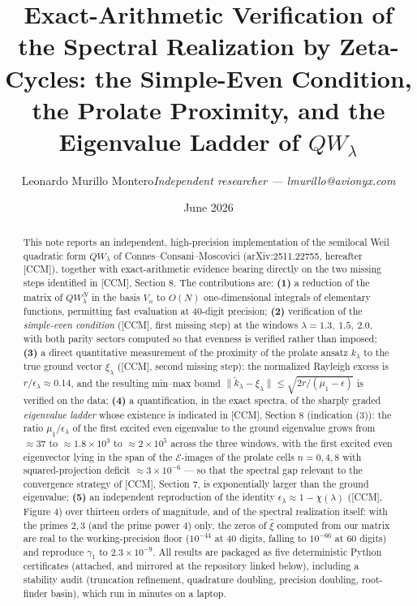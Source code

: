 \documentclass[
  letterpaper,
  11pt]{article}
\title{Exact-Arithmetic Verification of the Spectral Realization by Zeta-Cycles: the Simple-Even Condition, the Prolate Proximity, and the Eigenvalue Ladder of \(QW_\lambda\)}
\author{Leonardo Murillo Montero\newline\textit{Independent researcher — lmurillo@avionyx.com}}
\date{June 2026}
\theoremstyle{plain}
\theoremstyle{definition}
\theoremstyle{remark}
\begin{document}
\maketitle
\begin{abstract}
This note reports an independent, high-precision implementation of the semilocal Weil quadratic form \(QW_\lambda\) of Connes--Consani--Moscovici (arXiv:2511.22755, hereafter {[}CCM{]}), together with exact-arithmetic evidence bearing directly on the two missing steps identified in {[}CCM{]}, Section 8. The contributions are: \textbf{(1)} a reduction of the matrix of \(QW_\lambda^N\) in the basis \(V_n\) to \(O(N)\) one-dimensional integrals of elementary functions, permitting fast evaluation at 40-digit precision; \textbf{(2)} verification of the \emph{simple-even condition} ({[}CCM{]}, first missing step) at the windows \(\lambda = 1.3,\ 1.5,\ 2.0\), with both parity sectors computed so that evenness is verified rather than imposed; \textbf{(3)} a direct quantitative measurement of the proximity of the prolate ansatz \(k_\lambda\) to the true ground vector \(\xi_\lambda\) ({[}CCM{]}, second missing step): the normalized Rayleigh excess is \(r/\epsilon_\lambda \approx 0.14\), and the resulting min--max bound \(\|\tilde k_\lambda - \xi_\lambda\| \le \sqrt{2r/(\mu_1-\epsilon)}\) is verified on the data; \textbf{(4)} a quantification, in the exact spectra, of the sharply graded \emph{eigenvalue ladder} whose existence is indicated in {[}CCM{]}, Section 8 (indication (3)): the ratio \(\mu_1/\epsilon_\lambda\) of the first excited even eigenvalue to the ground eigenvalue grows from \(\approx 37\) to \(\approx 1.8\times10^3\) to \(\approx 2\times10^5\) across the three windows, with the first excited even eigenvector lying in the span of the \(\mathcal E\)-images of the prolate cells \(n = 0,4,8\) with squared-projection deficit \(\approx 3\times10^{-6}\) --- so that the spectral gap relevant to the convergence strategy of {[}CCM{]}, Section 7, is exponentially larger than the ground eigenvalue; \textbf{(5)} an independent reproduction of the identity \(\epsilon_\lambda \approx 1-\chi(\lambda)\) ({[}CCM{]}, Figure 4) over thirteen orders of magnitude, and of the spectral realization itself: with the primes \(2, 3\) (and the prime power \(4\)) only, the zeros of \(\widehat\xi\) computed from our matrix are real to the working-precision floor (\(10^{-44}\) at 40 digits, falling to \(10^{-66}\) at 60 digits) and reproduce \(\gamma_1\) to \(2.3\times10^{-9}\). All results are packaged as five deterministic Python certificates (attached, and mirrored at the repository linked below), including a stability audit (truncation refinement, quadrature doubling, precision doubling, root-finder basin), which run in minutes on a laptop.
\end{abstract}
\end{document}
